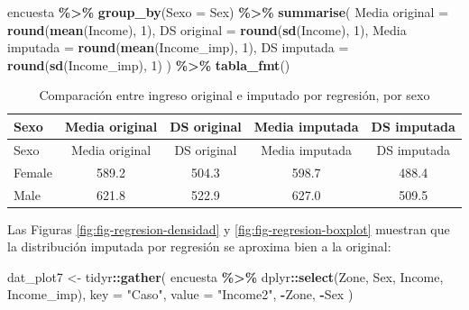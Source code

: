 \documentclass[
  spanish,
  12pt,
]{book}
\newenvironment{Shaded}{\begin{snugshade}}{\end{snugshade}}
\newcommand{\AttributeTok}[1]{\textcolor[rgb]{0.13,0.29,0.53}{#1}}
\newcommand{\DecValTok}[1]{\textcolor[rgb]{0.00,0.00,0.81}{#1}}
\newcommand{\FunctionTok}[1]{\textcolor[rgb]{0.13,0.29,0.53}{\textbf{#1}}}
\newcommand{\NormalTok}[1]{#1}
\newcommand{\OtherTok}[1]{\textcolor[rgb]{0.56,0.35,0.01}{#1}}
\newcommand{\SpecialCharTok}[1]{\textcolor[rgb]{0.81,0.36,0.00}{\textbf{#1}}}
\newcommand{\StringTok}[1]{\textcolor[rgb]{0.31,0.60,0.02}{#1}}
\begin{document}
\begin{Shaded}
\begin{Highlighting}[]
\NormalTok{encuesta }\SpecialCharTok{\%\textgreater{}\%}
  \FunctionTok{group\_by}\NormalTok{(}\AttributeTok{Sexo =}\NormalTok{ Sex) }\SpecialCharTok{\%\textgreater{}\%}
  \FunctionTok{summarise}\NormalTok{(}
    \StringTok{\textasciigrave{}}\AttributeTok{Media original}\StringTok{\textasciigrave{}}  \OtherTok{=} \FunctionTok{round}\NormalTok{(}\FunctionTok{mean}\NormalTok{(Income), }\DecValTok{1}\NormalTok{),}
    \StringTok{\textasciigrave{}}\AttributeTok{DS original}\StringTok{\textasciigrave{}}     \OtherTok{=} \FunctionTok{round}\NormalTok{(}\FunctionTok{sd}\NormalTok{(Income), }\DecValTok{1}\NormalTok{),}
    \StringTok{\textasciigrave{}}\AttributeTok{Media imputada}\StringTok{\textasciigrave{}}  \OtherTok{=} \FunctionTok{round}\NormalTok{(}\FunctionTok{mean}\NormalTok{(Income\_imp), }\DecValTok{1}\NormalTok{),}
    \StringTok{\textasciigrave{}}\AttributeTok{DS imputada}\StringTok{\textasciigrave{}}     \OtherTok{=} \FunctionTok{round}\NormalTok{(}\FunctionTok{sd}\NormalTok{(Income\_imp), }\DecValTok{1}\NormalTok{)}
\NormalTok{  ) }\SpecialCharTok{\%\textgreater{}\%} \FunctionTok{tabla\_fmt}\NormalTok{()}
\end{Highlighting}
\end{Shaded}

\begin{longtable}[]{@{}lcccc@{}}
\caption{\label{tab:tab-sesgo-regresion-sexo}Comparación entre ingreso original e imputado por regresión, por sexo}\tabularnewline
\toprule\noalign{}
Sexo & Media original & DS original & Media imputada & DS imputada \\
\midrule\noalign{}
\endfirsthead
\toprule\noalign{}
Sexo & Media original & DS original & Media imputada & DS imputada \\
\midrule\noalign{}
\endhead
\bottomrule\noalign{}
\endlastfoot
Female & 589.2 & 504.3 & 598.7 & 488.4 \\
Male & 621.8 & 522.9 & 627.0 & 509.5 \\
\end{longtable}

Las Figuras \ref{fig:fig-regresion-densidad} y \ref{fig:fig-regresion-boxplot} muestran que la distribución imputada por regresión se aproxima bien a la original:

\begin{Shaded}
\begin{Highlighting}[]
\NormalTok{dat\_plot7 }\OtherTok{\textless{}{-}}\NormalTok{ tidyr}\SpecialCharTok{::}\FunctionTok{gather}\NormalTok{(}
\NormalTok{  encuesta }\SpecialCharTok{\%\textgreater{}\%}\NormalTok{ dplyr}\SpecialCharTok{::}\FunctionTok{select}\NormalTok{(Zone, Sex, Income, Income\_imp),}
  \AttributeTok{key =} \StringTok{"Caso"}\NormalTok{, }\AttributeTok{value =} \StringTok{"Income2"}\NormalTok{, }\SpecialCharTok{{-}}\NormalTok{Zone, }\SpecialCharTok{{-}}\NormalTok{Sex}
\NormalTok{)}
\end{Highlighting}
\end{Shaded}
\end{document}
